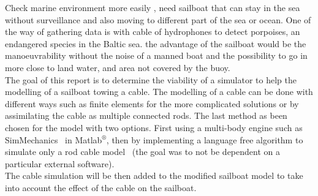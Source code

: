 Check marine environment more easily , need sailboat that can stay in the sea without surveillance 
and also moving to different part of the sea or ocean. One of the way of gathering data is with cable of 
hydrophones to detect porpoises, an endangered species in the Baltic sea. the advantage of the sailboat would be the manoeuvrability without the noise of a manned boat and the possibility to go in more close to land water, and area not covered by the buoy.\\



The goal of this report is to determine the viability of a simulator to help
the modelling of a sailboat towing a cable. The modelling of a cable can be done
with different ways such as finite elements for the more complicated solutions or by assimilating the cable
as multiple connected rods. The last method as been chosen for the model with two options. First using 
a multi-body engine such as SimMechanics\texttrademark~ in Matlab$^{\circledR}$, then by implementing a language free algorithm to simulate
only a rod cable model~\cite{johansen2007modelling} (the goal was to not be dependent on a particular external software).\\
The cable simulation will be then added to the modified sailboat model to take into account the effect of
the cable on the sailboat.